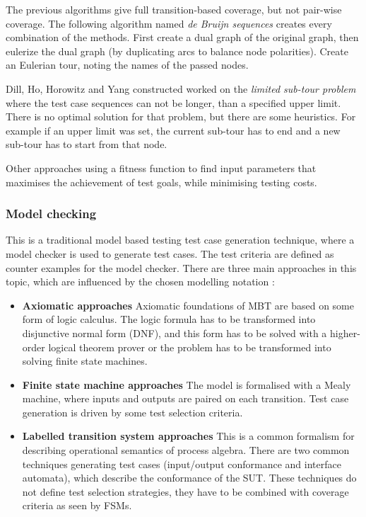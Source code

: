 The previous algorithms give full transition-based coverage, but not pair-wise coverage. The following algorithm named \textit{de Bruijn sequences} creates every combination of the methods. First create a dual graph of the original graph, then eulerize the dual graph (by duplicating arcs to balance node polarities). Create an Eulerian tour, noting the names of the passed nodes.

Dill, Ho, Horowitz and Yang constructed worked on the \textit{limited sub-tour problem} where the test case sequences can not be longer, than a specified upper limit. There is no optimal solution for that problem, but there are some heuristics. For example if an upper limit was set, the current sub-tour has to end and a new sub-tour has to start from that node.

Other approaches using a fitness function to find input parameters that maximises the achievement of test goals, while minimising testing costs.


\subsubsection{Model checking}
\label{ssub:modelchecking}

This is a traditional model based testing test case generation technique, where a model checker is used to generate test cases. The test criteria are defined as counter examples for the model checker. There are three main approaches in this topic, which are influenced by the chosen modelling notation \cite{sub:modelling}:

\begin{itemize}
	\item \textbf{Axiomatic approaches} Axiomatic foundations of MBT are based on some form of logic calculus. The logic formula has to be transformed into disjunctive normal form (DNF), and this form has to be solved with a higher-order logical theorem prover or the problem has to be transformed into solving finite state machines.
	\item \textbf{Finite state machine approaches} The model is formalised with a Mealy machine, where inputs and outputs are paired on each transition. Test case generation is driven by some test selection criteria.
	\item \textbf{Labelled transition system approaches} This is a common formalism for describing operational semantics of process algebra. There are two common techniques generating test cases (input/output conformance and interface automata), which describe the conformance of the SUT. These techniques do not define test selection strategies, they have to be combined with coverage criteria as seen by FSMs.
\end{itemize}

